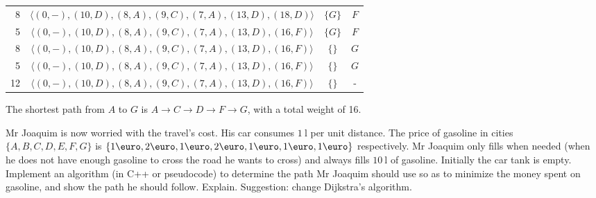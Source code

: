 \documentclass{cal}
\begin{document}
{\begin{center}
\begin{tabular}{r | c c c}
    8             & $\langle (     0, -), (    10, D), (     8, A), (     9, C), (     7, A), (    13, D), (    18, D) \rangle$ & $\{            G\}$ & $F$ \\
    5             & $\langle (     0, -), (    10, D), (     8, A), (     9, C), (     7, A), (    13, D), (    16, F) \rangle$ & $\{            G\}$ & $F$ \\
    8             & $\langle (     0, -), (    10, D), (     8, A), (     9, C), (     7, A), (    13, D), (    16, F) \rangle$ & $\{             \}$ & $G$ \\
    5             & $\langle (     0, -), (    10, D), (     8, A), (     9, C), (     7, A), (    13, D), (    16, F) \rangle$ & $\{             \}$ & $G$ \\
    12            & $\langle (     0, -), (    10, D), (     8, A), (     9, C), (     7, A), (    13, D), (    16, F) \rangle$ & $\{             \}$ & -   \\
\end{tabular} \end{center}

The shortest path from $A$ to $G$ is $A \rightarrow C \rightarrow D \rightarrow F \rightarrow G$, with a total weight of 16.

Mr Joaquim is now worried with the travel's cost. His car consumes $\SI{1}{\litre}$ per unit distance. The price of gasoline in cities $\{A,B,C,D,E,F,G\}$ is $\{1\eqeuro, 2\eqeuro, 1\eqeuro, 2\eqeuro, 1\eqeuro, 1\eqeuro, 1\eqeuro\}$ respectively. Mr Joaquim only fills when needed (when he does not have enough gasoline to cross the road he wants to cross) and always fills $\SI{10}{\litre}$ of gasoline. Initially the car tank is empty. Implement an algorithm (in C++ or pseudocode) to determine the path Mr Joaquim should use so as to minimize the money spent on gasoline, and show the path he should follow. Explain. Suggestion: change Dijkstra's algorithm.

\ansseparator

}
\end{document}

